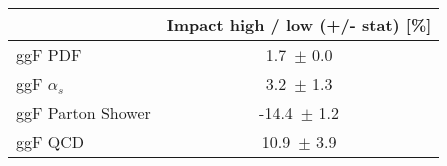 \begin{tabular}{| l || c  | }
\hline
 & Impact high / low (+/- stat) [\%] \tabularnewline
\hline
ggF PDF & 1.7\, $\pm$  0.0 \tabularnewline
ggF $\alpha_s$ & 3.2\, $\pm$  1.3 \tabularnewline
ggF Parton Shower & -14.4\, $\pm$  1.2 \tabularnewline
ggF QCD  & 10.9\, $\pm$  3.9 \tabularnewline
\hline
\end{tabular}